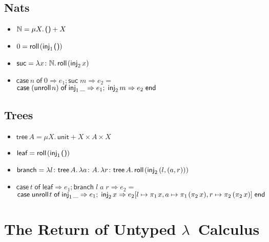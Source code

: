 \documentclass{lecturenotes}
\newcommand{\tabs}[3]{\ensuremath{\lambda #1 \colon #2.\,#3}}
\newcommand{\app}[2]{\ensuremath{#1\;#2}}
\newcommand{\utype}{\textsf{unit}\xspace}
\newcommand{\unit}{\ensuremath{\textsf{(}\mkern0.5mu\textsf{)}}}
\newcommand{\prodtype}[2]{\ensuremath{#1 \times #2}}
\newcommand{\pair}[2]{\ensuremath{(#1, #2)}}
\newcommand{\projl}[1]{\ensuremath{\pi_1\mkern2mu#1}}
\newcommand{\projr}[1]{\ensuremath{\pi_2\mkern3mu#1}}
\newcommand{\sumtype}[2]{\ensuremath{#1 + #2}}
\newcommand{\injl}[1]{\ensuremath{\textsf{inj}_1\mkern2mu#1}}
\newcommand{\injr}[1]{\ensuremath{\textsf{inj}_2\mkern3mu#1}}
\newcommand{\case}[5]{\ensuremath{\textsf{case}\mkern5mu#1\mkern5mu\textsf{of}\mkern5mu\injl{#2} \Rightarrow #3;\mkern5mu\injr{#4} \Rightarrow #5\mkern5mu\textsf{end}}}
\newcommand{\rectype}[2]{\ensuremath{\mu #1.\,#2}}
\newcommand{\roll}[1]{\textsf{roll}\mkern2mu#1}
\newcommand{\unroll}[1]{\textsf{unroll}\mkern2mu#1}
\begin{document}
\subsection{Nats}
\label{sec:nats}

\begin{itemize}
\item $\mathbb{N} = \rectype{X}{\sumtype{\unit}{X}}$
\item $0 = \roll{(\injl{\unit})}$
\item $\textsf{suc} = \tabs{x}{\mathbb{N}}{\roll{(\injr{x})}}$
\item $\textsf{case}\,n \mathrel{\textsf{of}} 0 \Rightarrow e_1; \app{\textsf{suc}}{m} \Rightarrow e_2 = $\\
  $\case{(\unroll{n})}{\_}{e_1}{m}{e_2}$
\end{itemize}

\subsection{Trees}
\label{sec:trees}

\begin{itemize}
\item $\textsf{tree}\,A = \rectype{X}{\sumtype{\utype}{\prodtype{X}{\prodtype{A}{X}}}}$
\item $\textsf{leaf} = \roll{(\injl{\unit})}$
\item $\textsf{branch} = \tabs{l}{\textsf{tree}\,A}{\tabs{a}{A}{\tabs{r}{\textsf{tree}\,A}{\roll{(\injr{\pair{l}{\pair{a}{r}}})}}}}$
\item $\textsf{case}\,t \mathrel{\textsf{of}} \textsf{leaf} \Rightarrow e_1; \app{\app{\app{\textsf{branch}}{l}}{a}}{r} \Rightarrow e_2 =$\\
  $\case{\unroll{t}}{\_}{e_1}{x}{e_2[l \mapsto \projl{x}, a \mapsto \projl{(\projr{x})}, r \mapsto \projr{(\projr{x})}]}$
\end{itemize}

\section{The Return of Untyped $\lambda$~Calculus}
\label{sec:return-untyp-lambda}
\end{document}

